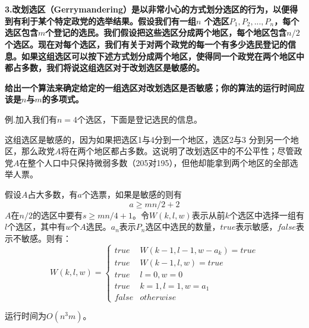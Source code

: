 
\chapter{}

\textbf{
3.改划选区（Gerrymandering）是以非常小心的方式划分选区的行为，以便得到有利于某个特定政党的选举结果。假设我们有一组$n$ 个选区$P_1,P_2,...,P_n$，每个选区包含$m$个登记的选民。我们假设把这些选区分成两个地区，每个地区包含$n/2$个选区。现在对每个选区，我们有关于对两个政党的每一个有多少选民登记的信息。如果这组选区可以按下述方式划分成两个地区，使得同一个政党在两个地区中都占多数，我们将说这组选区对于改划选区是敏感的。
}

\textbf{
给出一个算法来确定给定的一组选区对改划选区是否敏感；你的算法的运行时间应该是$n$与$m$的多项式。
}

{\color{blue}
例.加入我们有$n=4$个选区，下面是登记选民的信息。
}

\begin{table}[H]
\caption{数据}
\label{tb}
\centering
{}
\end{table}

{\color{blue}
这组选区是敏感的，因为如果把选区1与4分到一个地区，选区2与3 分到另一个地区，那么政党$A$将在两个地区都占多数。这说明了改划选区中的不公平性；尽管政党$A$在整个人口中只保持微弱多数（205对195），但他却能拿到两个地区的全部选举人票。
}

假设$A$占大多数，有$a$个选票，如果是敏感的则有
$$a\geq mn/2+2$$
$A$在$n/2$的选区中要有$s\geq mn/4+1$。令$W(k,l,w)$表示从前$k$个选区中选择一组有$l$个选区，其中有$w$个$A$选民。$a_n$表示$P_n$选区中选民的数量，$true$表示敏感，$false$表示不敏感。则有：
\begin{equation}
W(k,l,w)=
\left\{
             \begin{array}{ll}
             true
             & W(k-1,l-1,w-a_k)=true \\
             true
             & W(k-1,l,w)=true \\
             true
             & l=0,w=0 \\
             true
             & k=1,l=1,w=a_1 \\
             false
             & otherwise
             \end{array}
\right.
\end{equation}

运行时间为$O(n^3m)$。








